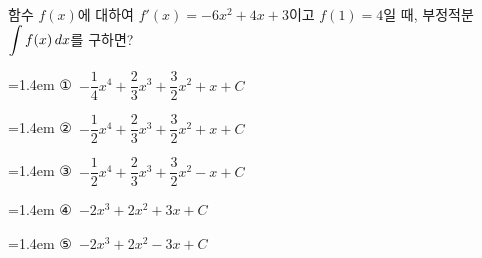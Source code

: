 함수 $f(x)$에 대하여 $f'(x)=-6x^2+4x+3$이고 $f(1)=4$일 때, 부정적분 $\displaystyle\int f(x)\mkern3mu dx$를 구하면? 
\par\medskip\par\noindent\hangindent=1.4em {\small ①}\ $-\dfrac{1}{4}x^4+\dfrac{2}{3}x^3+\dfrac{3}{2}x^2+x+C$\par\noindent\hangindent=1.4em {\small ②}\ $-\dfrac{1}{2}x^4+\dfrac{2}{3}x^3+\dfrac{3}{2}x^2+x+C$\par\noindent\hangindent=1.4em {\small ③}\ $-\dfrac{1}{2}x^4+\dfrac{2}{3}x^3+\dfrac{3}{2}x^2-x+C$\par\noindent\hangindent=1.4em {\small ④}\ $-2x^3+2x^2+3x+C$\par\noindent\hangindent=1.4em {\small ⑤}\ $-2x^3+2x^2-3x+C$\par\medskip
